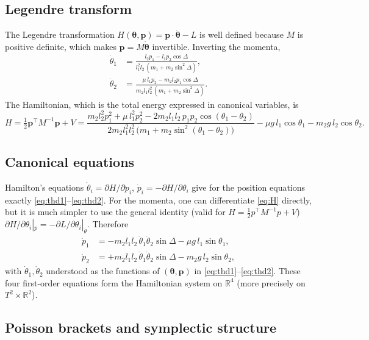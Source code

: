 \documentclass[11pt,a4paper]{book}
\theoremstyle{definition}
\theoremstyle{remark}
\begin{document}
\subsection{Legendre transform}

The Legendre transformation $H(\bm\theta,\bm p)=\bm p\cdot\dot{\bm\theta}-L$ is well defined because $M$ is
positive definite, which makes $\bm p=M\dot{\bm\theta}$ invertible. Inverting the momenta,
\begin{align}
  \dot\theta_1&=\frac{l_2p_1-l_1p_2\cos\Delta}{l_1^2l_2\,(m_1+m_2\sin^2\Delta)},\label{eq:thd1}\\
  \dot\theta_2&=\frac{\mu\,l_1p_2-m_2l_2p_1\cos\Delta}{m_2l_1l_2^2\,(m_1+m_2\sin^2\Delta)}.\label{eq:thd2}
\end{align}
The Hamiltonian, which is the total energy expressed in canonical variables, is
\begin{equation}
  H=\tfrac12\bm p^{\top}M^{-1}\bm p+V
   =\frac{m_2l_2^2p_1^2+\mu\,l_1^2p_2^2-2m_2l_1l_2\,p_1p_2\cos(\theta_1-\theta_2)}
         {2m_2l_1^2l_2^2\,\big(m_1+m_2\sin^2(\theta_1-\theta_2)\big)}
   -\mu g\,l_1\cos\theta_1-m_2g\,l_2\cos\theta_2 .
  \label{eq:H}
\end{equation}

\subsection{Canonical equations}

Hamilton's equations $\dot\theta_i=\partial H/\partial p_i$, $\dot p_i=-\partial H/\partial\theta_i$ give for the
position equations exactly \eqref{eq:thd1}--\eqref{eq:thd2}. For the momenta, one can differentiate
\eqref{eq:H} directly, but it is much simpler to use the general identity (valid for $H=\tfrac12p^\top M^{-1}p+V$)
$\partial H/\partial\theta_i|_{p}=-\partial L/\partial\theta_i|_{\dot\theta}$. Therefore
\begin{align}
  \dot p_1&=-m_2l_1l_2\,\dot\theta_1\dot\theta_2\sin\Delta-\mu g\,l_1\sin\theta_1,\\
  \dot p_2&=+m_2l_1l_2\,\dot\theta_1\dot\theta_2\sin\Delta-m_2g\,l_2\sin\theta_2,
\end{align}
with $\dot\theta_1,\dot\theta_2$ understood as the functions of $(\bm\theta,\bm p)$ in \eqref{eq:thd1}--\eqref{eq:thd2}.
These four first-order equations form the Hamiltonian system on $\mathbb R^4$ (more precisely on $T^2\times\mathbb R^2$).

\subsection{Poisson brackets and symplectic structure}
\end{document}

